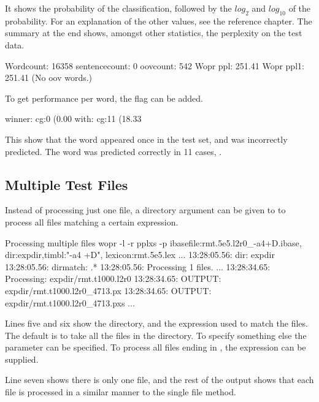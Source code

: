 \documentclass[a4paper,10pt,twoside]{report}
\begin{document}
It shows the probability of the classification, followed by the
$log_2$ and $log_{10}$ of the probability. For an explanation of the
other values, see the reference chapter. The summary at the end shows,
amongst other statistics, the perplexity on the test data.

\begin{wout}{}
Wordcount: 16358 sentencecount: 0 oovcount: 542
Wopr ppl:    251.41 Wopr ppl1:    251.41  (No oov words.)
\end{wout}

To get performance per word, the  flag can be added.

\begin{wout}{}
winner: cg:0 (0.00%
with: cg:11 (18.33%
\end{wout}

This show that the word  appeared once in the test set,
and was incorrectly predicted. The word  was predicted
correctly in \num{11} cases, \etc{}.

\subsection{Multiple Test Files}

Instead of processing just one file, a directory argument can be given
to \wopr{} to process all files matching a certain expression.

\begin{bash}{Processing multiple files}
wopr -l -r pplxs -p ibasefile:rmt.5e5.l2r0_-a4+D.ibase,
                    dir:expdir,timbl:"-a4 +D",
                    lexicon:rmt.5e5.lex
...
13:28:05.56:  dir:             expdir
13:28:05.56:  dirmatch:        .*
13:28:05.56: Processing 1 files.
...
13:28:34.65: Processing: expdir/rmt.t1000.l2r0
13:28:34.65: OUTPUT:     expdir/rmt.t1000.l2r0_4713.px
13:28:34.65: OUTPUT:     expdir/rmt.t1000.l2r0_4713.pxs
...
\end{bash}

Lines five and six show the directory, and the expression used to
match the files. The default is to take all the files in the
directory. To specify something else the parameter  can
be specified. To process all files ending in , the
expression  can be supplied.

Line seven shows there is only one file, and the rest of the output
shows that each file is processed in a similar manner to the single
file method.
\end{document}

